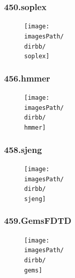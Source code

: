 \documentclass[12pt,a4paper]{article}
\newcommand{\imagesPath}{/home/nick/arch-ntua/ex02/graphs}
\newcommand{\soplex}{450.soplex.cslab_branch_predictors.out.pdf}
\newcommand{\hmmer}{456.hmmer.cslab_branch_predictors.out.pdf}
\newcommand{\sjeng}{458.sjeng.cslab_branch_predictors.out.pdf}
\newcommand{\gems}{459.GemsFDTD.cslab_branch_predictors.out.pdf}
\newcommand{\dirbb}{4.2/ii}
\begin{document}
				\subsubsection{450.soplex}
					\begin{figure}[H]
						\begin{center}
							 \texttt{[image: \\imagesPath/\\dirbb/\\soplex]}
						\end{center}
					\end{figure}
				
				\subsubsection{456.hmmer}
					\begin{figure}[H]
						\begin{center}
							 \texttt{[image: \\imagesPath/\\dirbb/\\hmmer]}
						\end{center}
					\end{figure}
				
				\subsubsection{458.sjeng}
					\begin{figure}[H]
						\begin{center}
							 \texttt{[image: \\imagesPath/\\dirbb/\\sjeng]}
						\end{center}
					\end{figure}
				
				\subsubsection{459.GemsFDTD}
					\begin{figure}[H]
						\begin{center}
							 \texttt{[image: \\imagesPath/\\dirbb/\\gems]}
						\end{center}
					\end{figure}
				
\end{document}

